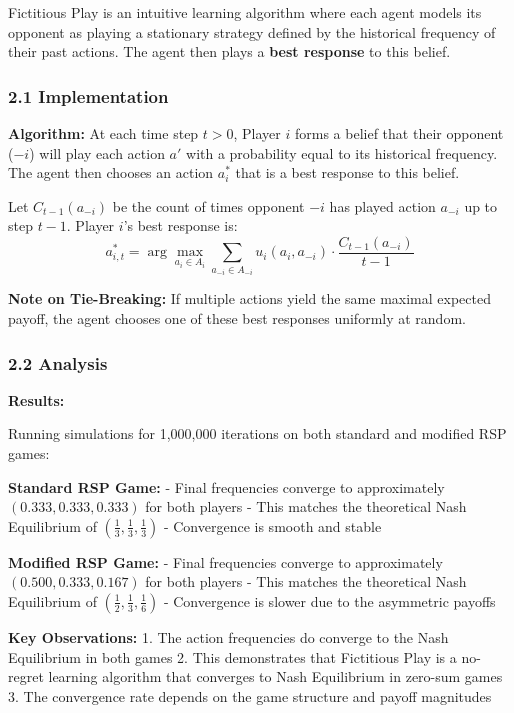 \documentclass[12pt]{article}
\begin{document}
{{{{Fictitious Play is an intuitive learning algorithm where each agent models its opponent as playing a stationary strategy defined by the historical frequency of their past actions. The agent then plays a \textbf{best response} to this belief.

\subsubsection{2.1 Implementation}

\textbf{Algorithm:} At each time step $t > 0$, Player $i$ forms a belief that their opponent ($-i$) will play each action $a'$ with a probability equal to its historical frequency. The agent then chooses an action $a_i^*$ that is a best response to this belief.

Let $C_{t-1}(a_{-i})$ be the count of times opponent $-i$ has played action $a_{-i}$ up to step $t-1$. Player $i$'s best response is:
$$a_{i,t}^* = \arg\max_{a_i \in A_i} \sum_{a_{-i} \in A_{-i}} u_i(a_i, a_{-i}) \cdot \frac{C_{t-1}(a_{-i})}{t-1}$$

\textbf{Note on Tie-Breaking:} If multiple actions yield the same maximal expected payoff, the agent chooses one of these best responses uniformly at random.

\subsubsection{2.2 Analysis}

\textbf{Results:}

Running simulations for 1,000,000 iterations on both standard and modified RSP games:

\textbf{Standard RSP Game:}
- Final frequencies converge to approximately $(0.333, 0.333, 0.333)$ for both players
- This matches the theoretical Nash Equilibrium of $(\frac{1}{3}, \frac{1}{3}, \frac{1}{3})$
- Convergence is smooth and stable

\textbf{Modified RSP Game:}
- Final frequencies converge to approximately $(0.500, 0.333, 0.167)$ for both players
- This matches the theoretical Nash Equilibrium of $(\frac{1}{2}, \frac{1}{3}, \frac{1}{6})$
- Convergence is slower due to the asymmetric payoffs

\textbf{Key Observations:}
1. The action frequencies do converge to the Nash Equilibrium in both games
2. This demonstrates that Fictitious Play is a no-regret learning algorithm that converges to Nash Equilibrium in zero-sum games
3. The convergence rate depends on the game structure and payoff magnitudes

}}}}
\end{document}
